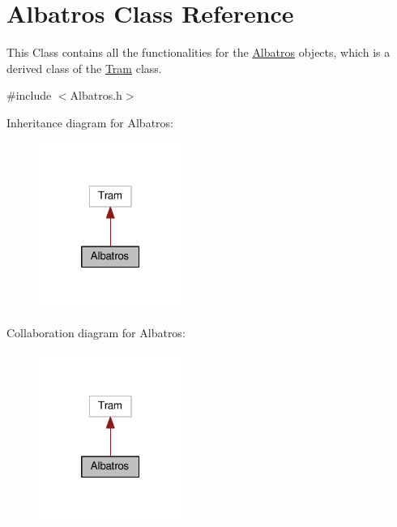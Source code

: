 \hypertarget{classAlbatros}{}\section{Albatros Class Reference}
\label{classAlbatros}


This Class contains all the functionalities for the \hyperlink{classAlbatros}{Albatros} objects, which is a derived class of the \hyperlink{classTram}{Tram} class.  




{\ttfamily \#include $<$Albatros.\+h$>$}



Inheritance diagram for Albatros\+:\nopagebreak
\begin{figure}[H]
\begin{center}
\leavevmode
\includegraphics[width=133pt]{classAlbatros__inherit__graph}
\end{center}
\end{figure}


Collaboration diagram for Albatros\+:\nopagebreak
\begin{figure}[H]
\begin{center}
\leavevmode
\includegraphics[width=133pt]{classAlbatros__coll__graph}
\end{center}
\end{figure}
